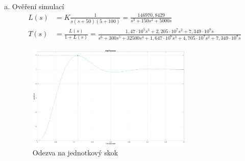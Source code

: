 \documentclass{article}
\begin{document}
\begin{enumerate}[a)]
    \item Ověření simulací
    \begin{align*}
        L(s) &= K\frac{1}{s(s+50)(5+100)} = \frac{146970,8429}{s^3+150s^2+5000s}\\
        T(s) &= \frac{L(s)}{1+L(s)} = \frac{1,47 \cdot 10^5 s^3 + 2,205 \cdot 10^7 s^2 + 7,349 \cdot 10^8 s}{ s^6 + 300 s^5 + 32500 s^4 + 1,647 \cdot 10^6 s^3 + 4,705 \cdot 10^7 s^2 + 7,349 \cdot 10^8 s}
    \end{align*}

    \begin{figure}[htb]
        \centering
        \includegraphics[clip, width=0.75\textwidth]{Step_Response.eps}
        \caption{Odezva na jednotkový skok}
        \label{fig:Unit_Step}
    \end{figure}
\end{enumerate}

\newpage
\end{document}
